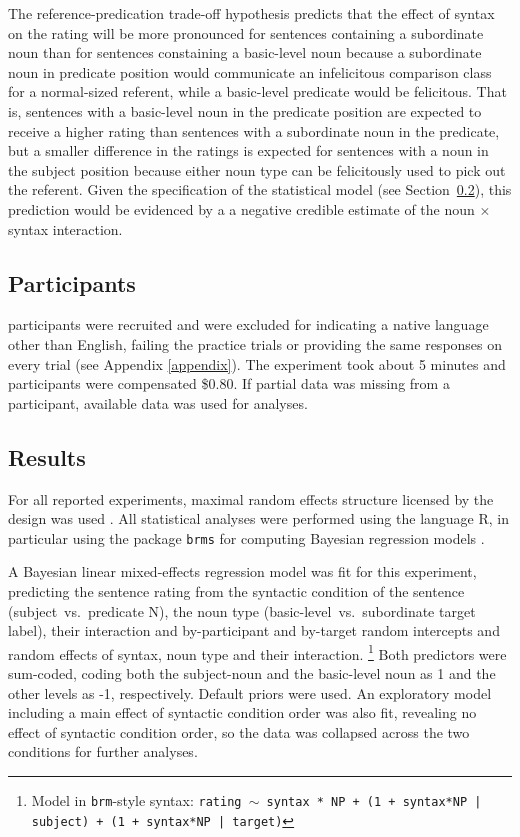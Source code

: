 The reference-predication trade-off hypothesis predicts that the effect of syntax on the rating will be more pronounced for sentences containing a subordinate noun than for sentences constaining a basic-level noun because a subordinate noun in predicate position would communicate an infelicitous comparison class for a normal-sized referent, while a basic-level predicate would be felicitous. That is, sentences with a basic-level noun in the predicate position are expected to receive a higher rating than sentences with a subordinate noun in the predicate, but a smaller difference in the ratings is expected for sentences with a noun in the subject position because either noun type can be felicitously used to pick out the referent. Given the specification of the statistical model (see Section~\ref{rating-results-section}), this prediction would be evidenced by a a negative credible estimate of the noun $\times$ syntax interaction.   

\subsection{Participants}
 participants were recruited and  were excluded for indicating a native language other than English, failing the practice trials or providing the same responses on every trial (see Appendix \ref{appendix}). The experiment took about 5 minutes and participants were compensated \$0.80. If partial data was missing from a participant, available data was used for analyses. 
\subsection{Results}
\label{rating-results-section}
For all reported experiments, maximal random effects structure licensed by the design was used \parencite{barr2013}. All statistical analyses were performed using the language R, in particular using the package \texttt{brms} for computing Bayesian regression models \parencite{Rteam2013, burkner2017advanced}.

A Bayesian linear mixed-effects regression model was fit for this experiment, predicting the sentence rating from the syntactic condition of the sentence (subject~vs.~predicate N), the noun type (basic-level~vs.~subordinate target label), their interaction and by-participant and by-target random intercepts and random effects of syntax, noun type and their interaction. \footnote{Model in \texttt{brm}-style syntax: \texttt{rating $\sim$ syntax * NP + (1 + syntax*NP | subject) + (1 + syntax*NP | target)}} 
Both predictors were sum-coded, coding both the subject-noun and the basic-level noun as 1 and the other levels as -1, respectively. Default priors were used.
An exploratory model including a main effect of syntactic condition order was also fit, revealing no effect of syntactic condition order, so the data was collapsed across the two conditions for further analyses. 


